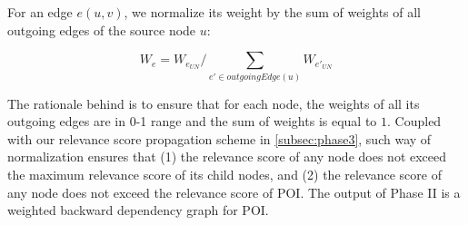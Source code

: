 For an edge $e(u, v)$, we normalize its weight by the sum of weights of all outgoing edges of the source node $u$:

\begin{equation}
    \label{eq:local-weight-normalization}
    W_e = W_{e_{UN}}/\sum_{e' \in outgoingEdge(u)} W_{e'_{UN}}
\end{equation}

The rationale behind is to ensure that for each node, the weights of all its outgoing edges are in 0-1 range and the sum of weights is equal to $1$.
%
Coupled with our relevance score propagation scheme in \cref{subsec:phase3}, such way of normalization ensures that (1) the relevance score of any node does not exceed the maximum relevance score of its child nodes, and (2) the relevance score of any node does not exceed the relevance score of POI.
%
The output of Phase II is a weighted backward dependency graph for POI.



